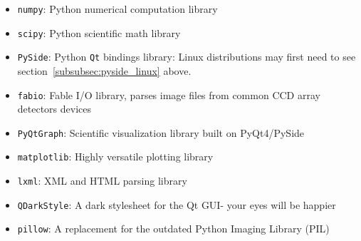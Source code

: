 \begin{itemize}
\item \verb|numpy|: Python numerical computation library
\item \verb|scipy|: Python scientific math library
\item \verb|PySide|: Python \verb|Qt| bindings library: 
    Linux distributions may first need to see section~\ref{subsubsec:pyside_linux} above.
\item \verb|fabio|: Fable I/O library, parses image files from common CCD array detectors devices
\item \verb|PyQtGraph|: Scientific visualization library built on PyQt4/PySide
\item \verb|matplotlib|: Highly versatile plotting library 
\item \verb|lxml|: XML and HTML parsing library 
\item \verb|QDarkStyle|: A dark stylesheet for the Qt GUI- your eyes will be happier
\item \verb|pillow|: A replacement for the outdated Python Imaging Library (PIL)
\end{itemize}



